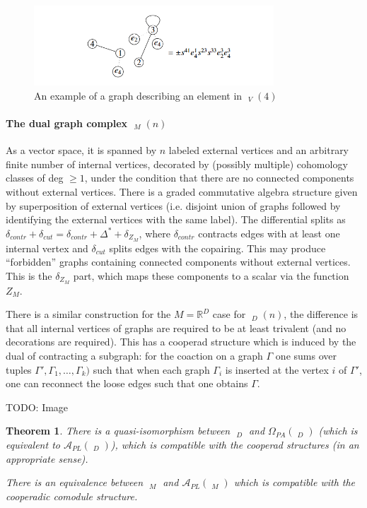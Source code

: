 \documentclass{scrartcl}
\theoremstyle{plain}
\newtheorem{theorem}{Theorem}[section]
\theoremstyle{definition}
\newcommand{\R}{\mathbb R}
\newcommand{\Apl}{\mathcal A_{PL}}
\DeclareMathOperator{\cConf}{\overline{Conf}}
\DeclareMathOperator{\coGra}{{}^*Gra}
\DeclareMathOperator{\coGraphs}{{}^*Graphs}
\begin{document}
\begin{figure}[ht]
    \centering
    \includegraphics[width=0.8\textwidth]{img/campos-willacher-graph-dual-example.png}
    \caption{An example of a graph describing an element in $\coGra_V(4)$}\label{cw-graph-example}
\end{figure}

\paragraph{The dual graph complex $\coGraphs_M(n)$} As a vector space, it is spanned by $n$ labeled external vertices and an arbitrary finite number of internal vertices, decorated by (possibly multiple) cohomology classes of deg $\geq 1$, under the condition that there are no connected components without external vertices. There is a graded commutative algebra structure given by superposition of external vertices (i.e. disjoint union of graphs followed by identifying the external vertices with the same label). The differential splits as $\delta_{contr} + \delta_{cut} = \delta_{contr} + \Delta^* + \delta_{Z_M}$, where $\delta_{contr}$ contracts edges with at least one internal vertex and $\delta_{cut}$ splits edges with the copairing. This may produce ``forbidden'' graphs containing connected components without external vertices. This is the $\delta_{Z_M}$ part, which maps these components to a scalar via the function $Z_M$.

There is a similar construction for the $M=\R^D$ case for $\coGraphs_D(n)$, the difference is that all internal vertices of graphs are required to be at least trivalent (and no decorations are required). This has a cooperad structure which is induced by the dual of contracting a subgraph: for the coaction on a graph $\Gamma$ one sums over tuples $\Gamma', \Gamma_1, \dots, \Gamma_k)$ such that when each graph $\Gamma_i$ is inserted at the vertex $i$ of $\Gamma'$, one can reconnect the loose edges such that one obtains $\Gamma$.  

TODO: Image

\begin{theorem}
There is a quasi-isomorphism between $\coGraphs_D$ and $\Omega_{PA}(\cConf_D)$ (which is equivalent to $\Apl(\cConf_D)$), which is compatible with the cooperad structures (in an appropriate sense).

There is an equivalence between $\coGraphs_M$ and $\mathcal A_{PL}(\cConf_M)$ which is compatible with the cooperadic comodule structure. 
\end{theorem}
\end{document}
